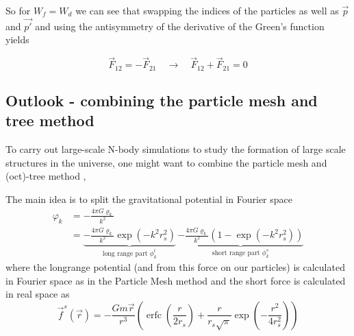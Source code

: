 So for $W_f = W_d$ we can see that swapping the indices of the particles as well as $\vec{p}$ and $\vec{p'}$ and using the antisymmetry of the derivative of the Green's function
yields

\begin{equation}
    \vec{F}_{12} = - \vec{F}_{21} \quad \rightarrow \quad \vec{F}_{12} + \vec{F}_{21} = 0
\end{equation}

\subsection{Outlook - combining the particle mesh and tree method}


To carry out large-scale N-body simulations
to study the formation of large scale structures
in the universe, one might want to combine the particle
mesh and (oct)-tree method \citep{Bagla02}, 

The main idea is to split the gravitational potential
in Fourier space
\begin{equation}
    \begin{aligned}
        \varphi_k & =-\frac{4 \pi G \varrho_k}{k^2} \\
        & =\underbrace{-\frac{4 \pi G \varrho_k}{k^2} \exp \left(-k^2 r_s^2\right)}_{\text{long range part } \phi_k^l}\,\underbrace{-\frac{4 \pi G \varrho_k}{k^2}\left(1-\exp \left(-k^2 r_s^2\right)\right)}_{\text{short range part } \phi_k^s}
    \end{aligned}
\end{equation}
where the longrange potential (and from this force on our particles) is calculated in Fourier space as
in the Particle Mesh method and the short force is calculated in
real space as
\begin{equation}
    \vec{f}^s(\vec{r})=-\frac{G m \vec{r}}{r^3}\left(\operatorname{erfc}\left(\frac{r}{2 r_s}\right)+\frac{r}{r_s \sqrt{\pi}} \exp \left(-\frac{r^2}{4 r_s^2}\right)\right)
\end{equation}

\pagebreak